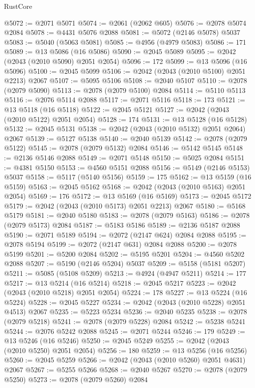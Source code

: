 \begin{lexlean}{RustCore}
\begin{coremodule}
@5072 := @2071 @5071
@5074 := @2061 (@2062 @605)
@5076 := @2078 @5074 @2084
@5078 := @4431 @5076 @2088
@5081 := @5072 (@2146 @5078) @5037
@5083 := @5040 (@5063 @5081)
@5085 := @4956 (@4979 @5083)
@5086 := 171
@5089 := @13 @5086 (@16 @5086)
@5090 := @2045 @5089
@5095 := @2042 (@2043 (@2010 @5090) @2051 @2054)
@5096 := 172
@5099 := @13 @5096 (@16 @5096)
@5100 := @2045 @5099
@5106 := @2042 (@2043 (@2010 @5100) @2051 @2213) @2067
@5107 := @5095 @5106
@5108 := @2040 @5107
@5110 := @2078 (@2079 @5090)
@5113 := @2078 (@2079 @5100) @2084
@5114 := @5110 @5113
@5116 := @2076 @5114 @2088
@5117 := @2071 @5116
@5118 := 173
@5121 := @13 @5118 (@16 @5118)
@5122 := @2045 @5121
@5127 := @2042 (@2043 (@2010 @5122) @2051 @2054)
@5128 := 174
@5131 := @13 @5128 (@16 @5128)
@5132 := @2045 @5131
@5138 := @2042 (@2043 (@2010 @5132) @2051 @2064) @2067
@5139 := @5127 @5138
@5140 := @2040 @5139
@5142 := @2078 (@2079 @5122)
@5145 := @2078 (@2079 @5132) @2084
@5146 := @5142 @5145
@5148 := @2136 @5146 @2088
@5149 := @2071 @5148
@5150 := @5025 @2084
@5151 := @4381 @5150
@5153 := @4560 @5151 @2088
@5156 := @5149 (@2146 @5153) @5037
@5158 := @5117 (@5140 @5156)
@5159 := 175
@5162 := @13 @5159 (@16 @5159)
@5163 := @2045 @5162
@5168 := @2042 (@2043 (@2010 @5163) @2051 @2054)
@5169 := 176
@5172 := @13 @5169 (@16 @5169)
@5173 := @2045 @5172
@5179 := @2042 (@2043 (@2010 @5173) @2051 @2213) @2067
@5180 := @5168 @5179
@5181 := @2040 @5180
@5183 := @2078 (@2079 @5163)
@5186 := @2078 (@2079 @5173) @2084
@5187 := @5183 @5186
@5189 := @2136 @5187 @2088
@5190 := @2071 @5189
@5194 := @2072 (@2147 @624) @2084 @2088
@5195 := @2078 @5194
@5199 := @2072 (@2147 @631) @2084 @2088
@5200 := @2078 @5199
@5201 := @5200 @2084
@5202 := @5195 @5201
@5204 := @4560 @5202 @2088
@5207 := @5190 (@2146 @5204) @5037
@5209 := @5158 (@5181 @5207)
@5211 := @5085 (@5108 @5209)
@5213 := @4924 (@4947 @5211)
@5214 := 177
@5217 := @13 @5214 (@16 @5214)
@5218 := @2045 @5217
@5223 := @2042 (@2043 (@2010 @5218) @2051 @2054)
@5224 := 178
@5227 := @13 @5224 (@16 @5224)
@5228 := @2045 @5227
@5234 := @2042 (@2043 (@2010 @5228) @2051 @4513) @2067
@5235 := @5223 @5234
@5236 := @2040 @5235
@5238 := @2078 (@2079 @5218)
@5241 := @2078 (@2079 @5228) @2084
@5242 := @5238 @5241
@5244 := @2076 @5242 @2088
@5245 := @2071 @5244
@5246 := 179
@5249 := @13 @5246 (@16 @5246)
@5250 := @2045 @5249
@5255 := @2042 (@2043 (@2010 @5250) @2051 @2054)
@5256 := 180
@5259 := @13 @5256 (@16 @5256)
@5260 := @2045 @5259
@5266 := @2042 (@2043 (@2010 @5260) @2051 @4631) @2067
@5267 := @5255 @5266
@5268 := @2040 @5267
@5270 := @2078 (@2079 @5250)
@5273 := @2078 (@2079 @5260) @2084

\end{coremodule}
\end{lexlean}

